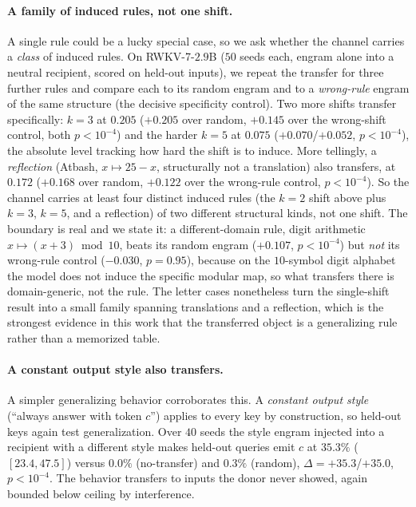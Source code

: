 \documentclass[11pt]{article}
\theoremstyle{definition}
\begin{document}
\paragraph{A family of induced rules, not one shift.}
A single rule could be a lucky special case, so we ask whether the channel carries a \emph{class} of induced rules. On RWKV-7-$2.9$B ($50$ seeds each, engram alone into a neutral recipient, scored on held-out inputs), we repeat the transfer for three further rules and compare each to its random engram and to a \emph{wrong-rule} engram of the same structure (the decisive specificity control). Two more shifts transfer specifically: $k{=}3$ at $0.205$ ($+0.205$ over random, $+0.145$ over the wrong-shift control, both $p<10^{-4}$) and the harder $k{=}5$ at $0.075$ ($+0.070$/$+0.052$, $p<10^{-4}$), the absolute level tracking how hard the shift is to induce. More tellingly, a \emph{reflection} (Atbash, $x\mapsto 25{-}x$, structurally not a translation) also transfers, at $0.172$ ($+0.168$ over random, $+0.122$ over the wrong-rule control, $p<10^{-4}$). So the channel carries at least four distinct induced rules (the $k{=}2$ shift above plus $k{=}3$, $k{=}5$, and a reflection) of two different structural kinds, not one shift. The boundary is real and we state it: a different-domain rule, digit arithmetic $x\mapsto(x{+}3)\bmod 10$, beats its random engram ($+0.107$, $p<10^{-4}$) but \emph{not} its wrong-rule control ($-0.030$, $p=0.95$), because on the $10$-symbol digit alphabet the model does not induce the specific modular map, so what transfers there is domain-generic, not the rule. The letter cases nonetheless turn the single-shift result into a small family spanning translations and a reflection, which is the strongest evidence in this work that the transferred object is a generalizing rule rather than a memorized table.

\paragraph{A constant output style also transfers.}
A simpler generalizing behavior corroborates this. A \emph{constant output style} (``always answer with token $c$'') applies to every key by construction, so held-out keys again test generalization. Over $40$ seeds the style engram injected into a recipient with a different style makes held-out queries emit $c$ at $35.3\%$ ($[23.4,47.5]$) versus $0.0\%$ (no-transfer) and $0.3\%$ (random), $\Delta=+35.3$/$+35.0$, $p<10^{-4}$. The behavior transfers to inputs the donor never showed, again bounded below ceiling by interference.
\end{document}
